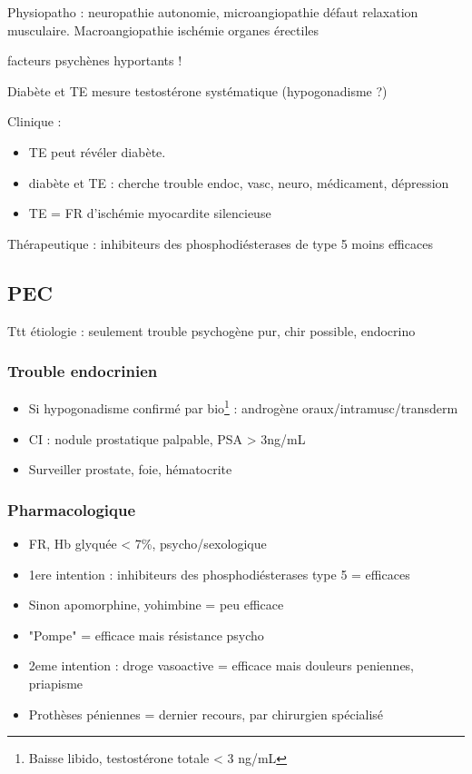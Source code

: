 \documentclass[11pt]{article}
\begin{document}
Physiopatho : neuropathie autonomie, microangiopathie \thus défaut relaxation
musculaire. Macroangiopathie \thus ischémie organes érectiles

\danger facteurs psychènes hyportants !

Diabète et TE \thus mesure testostérone systématique (hypogonadisme ?)

Clinique : 
\begin{itemize}
\item TE peut révéler diabète.
\item diabète et TE : cherche trouble endoc, vasc, neuro, médicament, dépression
\item TE = FR d'ischémie myocardite silencieuse \danger
\end{itemize}

Thérapeutique : inhibiteurs des phosphodiésterases de type 5 moins efficaces

\subsection{PEC}
\label{sec:orgbf8e2a8}
Ttt étiologie : seulement trouble psychogène pur, chir possible, endocrino

\subsubsection{Trouble endocrinien}
\label{sec:orgc6ec51c}
\begin{itemize}
\item Si hypogonadisme confirmé par bio\footnote{Baisse libido, testostérone totale < 3 ng/mL} : androgène oraux/intramusc/transderm
\item CI : nodule prostatique palpable, PSA > 3ng/mL
\item Surveiller prostate, foie, hématocrite
\end{itemize}

\subsubsection{Pharmacologique}
\label{sec:org06ff437}
\begin{itemize}
\item FR, Hb glyquée < 7\%, psycho/sexologique
\item 1ere intention : inhibiteurs des phosphodiésterases type 5 = efficaces
\item Sinon apomorphine, yohimbine = peu efficace
\item "Pompe" = efficace mais résistance psycho
\item 2eme intention : droge vasoactive = efficace mais douleurs peniennes, priapisme
\item Prothèses péniennes = dernier recours, par chirurgien spécialisé
\end{itemize}
\end{document}
